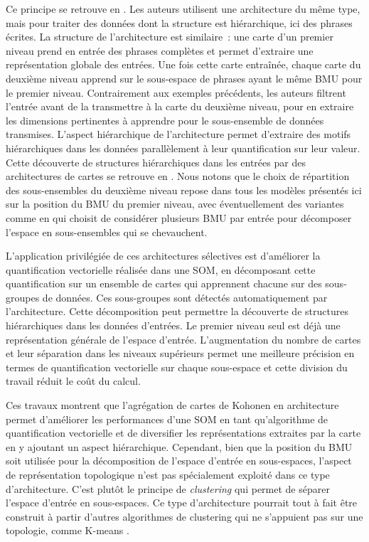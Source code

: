 \documentclass[../main]{subfiles}
\begin{document}
Ce principe se retrouve en \cite{miikkulainen_script_1992}. 
Les auteurs utilisent une architecture du même type, mais pour traiter des données dont la structure est hiérarchique, ici des phrases écrites. La structure de l'architecture est similaire~: une carte d'un premier niveau prend en entrée des phrases complètes et permet d'extraire une représentation globale des entrées. Une fois cette carte entraînée, chaque carte du deuxième niveau apprend sur le sous-espace de phrases ayant le même BMU pour le premier niveau. Contrairement aux exemples précédents, les auteurs filtrent l'entrée avant de la transmettre à la carte du deuxième niveau, pour en extraire les dimensions pertinentes à apprendre pour le sous-ensemble de données transmises. L'aspect hiérarchique de l'architecture permet d'extraire des motifs hiérarchiques dans les données parallèlement à leur quantification sur leur valeur.
Cette découverte de structures hiérarchiques dans les entrées par des architectures de cartes se retrouve en \cite{ordonez_hierarchical_2010,dittenbach_growing_2000}.
Nous notons que le choix de répartition des sous-ensembles du deuxième niveau repose dans tous les modèles présentés ici sur la position du BMU du premier niveau, avec éventuellement des variantes comme en \cite{suganthan_pattern_2001} qui choisit de considérer plusieurs BMU par entrée pour décomposer l'espace en sous-ensembles qui se chevauchent.

L'application privilégiée de ces architectures sélectives est d'améliorer la quantification vectorielle réalisée dans une SOM, en décomposant cette quantification sur un ensemble de cartes qui apprennent chacune sur des sous-groupes de données. Ces sous-groupes sont détectés automatiquement par l'architecture.
Cette décomposition peut permettre la découverte de structures hiérarchiques dans les données d'entrées.
Le premier niveau seul est déjà une représentation générale de l'espace d'entrée. L'augmentation du nombre de cartes et leur séparation dans les niveaux supérieurs permet une meilleure précision en termes de quantification vectorielle sur chaque sous-espace et cette division du travail réduit le coût du calcul.

Ces travaux montrent que l'agrégation de cartes de Kohonen en architecture permet d'améliorer les performances d'une SOM en tant qu'algorithme de quantification vectorielle et de diversifier les représentations extraites par la carte en y ajoutant un aspect hiérarchique.
Cependant, bien que la position du BMU soit utilisée pour la décomposition de l'espace d'entrée en sous-espaces, l'aspect de représentation topologique n'est pas spécialement exploité dans ce type d'architecture.
C'est plutôt le principe de \emph{clustering} qui permet de séparer l'espace d'entrée en sous-espaces. Ce type d'architecture pourrait tout à fait être construit à partir d'autres algorithmes de clustering qui ne s'appuient pas sur une topologie, comme K-means \parencite{1094577}.
\end{document}

